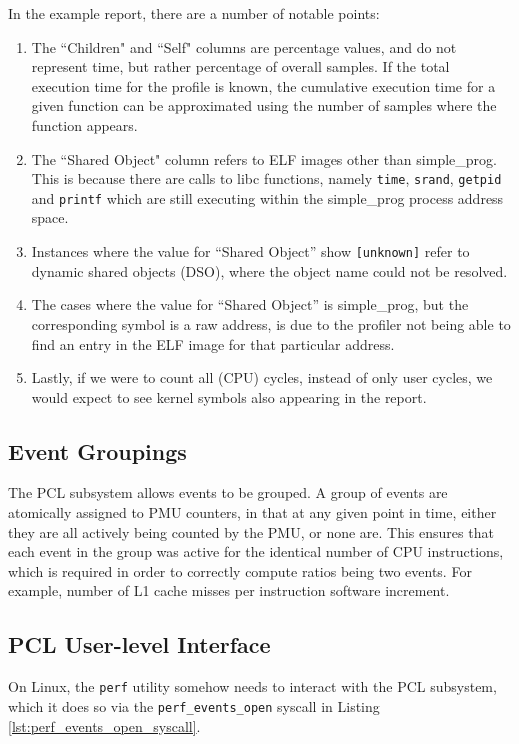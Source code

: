 In the example report, there are a number of notable points:
\ssp
\begin{enumerate}
    \item The ``Children" and ``Self" columns are percentage values, and do not represent time, but rather percentage of overall samples. If the total execution time for the profile is known, the cumulative execution time for a given function can be approximated using the number of samples where the function appears. 
    \item The ``Shared Object" column refers to ELF images other than simple\_prog. This is because there are calls to libc functions, namely \texttt{time}, \texttt{srand}, \texttt{getpid} and \texttt{printf} which are still executing within the simple\_prog process address space.
    \item Instances where the value for ``Shared Object'' show \texttt{[unknown]} refer to dynamic shared objects (DSO), where the object name could not be resolved.
    \item The cases where the value for ``Shared Object'' is simple\_prog, but the corresponding symbol is a raw address, is due to the profiler not being able to find an entry in the ELF image for that particular address.
    \item Lastly, if we were to count all (CPU) cycles, instead of only user cycles, we would expect to see kernel symbols also appearing in the report.
\end{enumerate}
\dsp

\subsection{Event Groupings}\label{sect:event_groupings}

The PCL subsystem allows events to be grouped. A group of events are atomically assigned to PMU counters, in that at any given point in time, either they are all actively being counted by the PMU, or none are. This ensures that each event in the group was active for the identical number of CPU instructions, which is required in order to correctly compute ratios being two events. For example, number of L1 cache misses per instruction software increment.

\subsection{PCL User-level Interface}\label{sect:perf_event_open}

On Linux, the \texttt{perf} utility somehow needs to interact with the PCL subsystem, which it does so via the \texttt{perf\_events\_open} syscall in Listing \ref{lst:perf_events_open_syscall}.

